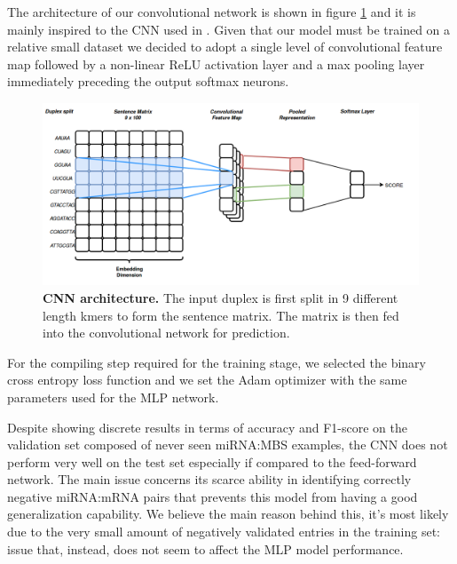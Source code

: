 The architecture of our convolutional network is shown in figure \ref{fig:cnn} and it is mainly inspired to the CNN used in \cite{cnn_arch}. Given that our model must be trained on a relative small dataset we decided to adopt a single level of convolutional feature map followed by a non-linear ReLU activation layer and a max pooling layer immediately preceding the output softmax neurons. 

\begin{figure}[hbt!]
	\centering
	\includegraphics[width=\textwidth, height=0.4\textheight]{Figures/cnn_arch}
	\caption{\textbf{CNN architecture.} The input duplex is first split in 9 different length kmers to form the sentence matrix. The matrix is then fed into the convolutional network for prediction.}
	\label{fig:cnn}
\end{figure}     

For the compiling step required for the training stage, we selected the binary cross entropy loss function and we set the Adam optimizer with the same parameters used for the MLP network.

Despite showing discrete results in terms of accuracy and F1-score on the validation set composed of never seen miRNA:MBS examples, the CNN does not perform very well on the test set especially if compared to the feed-forward network. The main issue
concerns its scarce ability in identifying correctly negative miRNA:mRNA pairs that prevents this model from having a good generalization capability. We believe the main reason behind this, it's most likely due to the very small amount of negatively validated entries in the training set: issue that, instead, does not seem to affect the MLP model performance.

  

